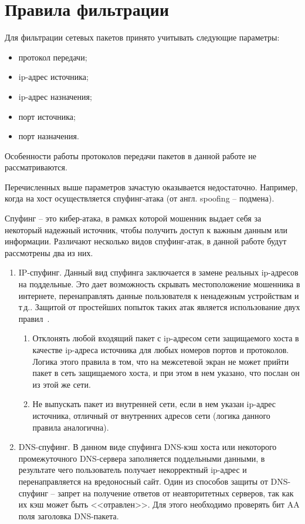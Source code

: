 \section{Правила фильтрации}

Для фильтрации сетевых пакетов принято учитывать следующие параметры:
\begin{itemize}
	\item протокол передачи;
	\item ip-адрес источника;
	\item ip-адрес назначения;
	\item порт источника;
	\item порт назначения.
\end{itemize}

Особенности работы протоколов передачи пакетов в данной работе не рассматриваются.

Перечисленных выше параметров зачастую оказывается недостаточно. Например, когда на хост осуществляется спуфинг-атака (от англ. spoofing -- подмена).


Спуфинг -- это кибер-атака, в рамках которой мошенник выдает себя за некоторый надежный источник, чтобы получить доступ к важным данным или информации\cite{spoof}. Различают несколько видов спуфинг-атак, в данной работе будут рассмотрены два из них.

\begin{enumerate}
	\item IP-спуфинг. Данный вид спуфинга заключается в замене реальных ip-адресов на поддельные. Это дает возможность скрывать местоположение мошенника в интернете, перенаправлять данные пользователя к ненадежным устройствам и т\,д.. Защитой от простейших попыток таких атак является использование двух правил~\cite{blockspoof}.
	\begin{enumerate}
		\item Отклонять любой входящий пакет с ip-адресом сети защищаемого хоста в качестве ip-адреса источника для любых номеров портов и протоколов. Логика этого правила в том, что на межсетевой экран не может  прийти пакет в сеть защищаемого хоста, и при этом в нем указано, что послан он из этой же сети. %
		\item Не выпускать пакет из внутренней сети, если в нем указан ip-адрес источника, отличный от внутренних адресов сети (логика данного правила аналогична).
	\end{enumerate}

	\item DNS-спуфинг. В данном виде спуфинга DNS-кэш хоста или некоторого промежуточного DNS-сервера заполняется поддельными данными, в результате чего пользователь получает некорректный ip-адрес и  перенаправляется на вредоносный сайт. Один из способов защиты от DNS-спуфинг -- запрет на получение ответов от неавторитетных серверов, так как их кэш может быть <<отравлен>>. Для этого необходимо проверять бит AA поля заголовка DNS-пакета.
\end{enumerate}

